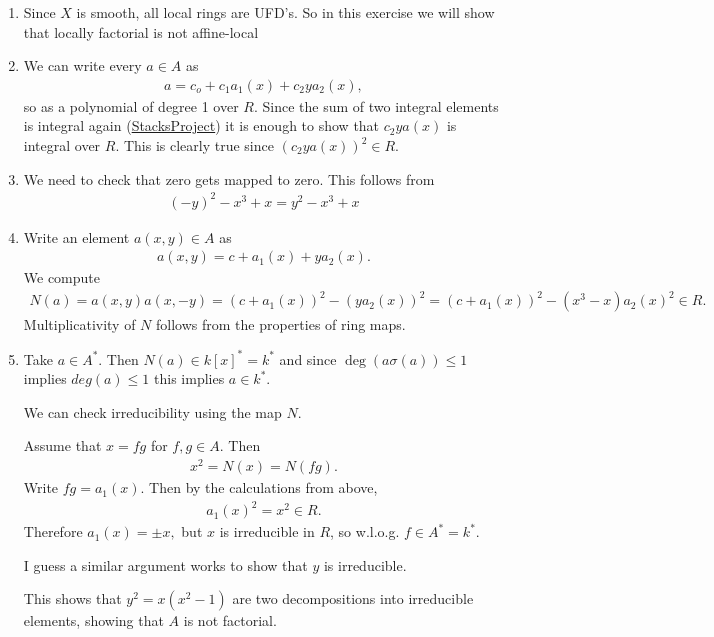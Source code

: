 \newcommand{\sheet}{12}




\maketitle{}

\begin{exercise}{3}
    \begin{enumerate}
        \item{Since $X$ is smooth, all local rings are UFD's. So in this
            exercise we will show that locally factorial is not affine-local}
        \item We can write every $a\in A$ as 
        \begin{align*}
            a=c_o+c_1a_1(x)+c_2ya_2(x),
        \end{align*}
        so as a polynomial of degree 1 over $R$. Since the sum of two integral elements is integral again (\href{https://stacks.math.columbia.edu/tag/00GO}{StacksProject})
        it is enough to show that $c_2ya(x)$ is integral over $R$. This is clearly true since $(c_2ya(x))^2\in R$.
        \item We need to check that zero gets mapped to zero. This follows from
        \begin{align*}
            (-y)^2-x^3+x=y^2-x^3+x
        \end{align*}
        \item Write an element $a(x,y)\in A$ as 
        \begin{align*}
            a(x,y)=c+a_1(x)+ya_2(x).
        \end{align*}
        We compute 
        \begin{align*}
            N(a)=a(x,y)a(x,-y)=(c+a_1(x))^2-(ya_2(x))^2=(c+a_1(x))^2-(x^3-x)a_2(x)^2\in R.
        \end{align*}
        Multiplicativity of $N$ follows from the properties of ring maps.
        \item Take $a\in A^*$. Then $N(a)\in k[x]^*=k^*$ and since $\deg(a\sigma(a))\leq 1$ implies $deg(a)\leq 1$ this implies $a\in k^*$.

        We can check irreducibility using the map $N.$

        Assume that $x=fg$ for $f,g\in A$. Then
        \begin{align*}
            x^2=N(x)=N(fg).
        \end{align*}
        Write $fg=a_1(x)$. Then by the calculations from above,
        \begin{align*}
            a_1(x)^2=x^2 \in R.
        \end{align*}
        Therefore $a_1(x)=\pm x,$ but $x$ is irreducible in $R$, so w.l.o.g. $f\in A^*=k^*$. 

        I guess a similar argument works to show that $y$ is irreducible.

        This shows that $y^2=x(x^2-1)$ are two decompositions into irreducible elements, showing that $A$ is not 
        factorial.
    \end{enumerate}
\end{exercise}


